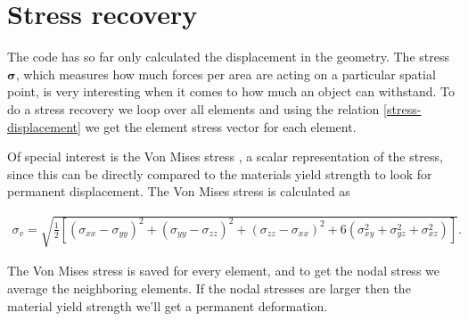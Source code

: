 \section{Stress recovery}

The code has so far only calculated the displacement in the geometry. The stress $\bm{\sigma}$, which measures how much forces per area are acting on a particular spatial point, is very interesting when it comes to how much an object can withstand. To do a stress recovery we loop over all elements and using the relation \eqref{stress-displacement} we get the element stress vector for each element.

Of special interest is the Von Mises stress \cite{VonMises}, a scalar representation of the stress, since this can be directly compared to the materials yield strength to look for permanent displacement. The Von Mises stress is calculated as 

\begin{align*}
\sigma_{v} = \sqrt{ \frac{1}{2} \left[  (\sigma_{xx} -\sigma_{yy})^2 + (\sigma_{yy} -\sigma_{zz})^2 + (\sigma_{zz} -\sigma_{xx})^2 + 6\left(\sigma_{xy}^2 + \sigma_{yz}^2 + \sigma_{xz}^2 \right) \right]}.
\end{align*}


The Von Mises stress is saved for every element, and to get the nodal stress we average the neighboring elements. If the nodal stresses are larger then the material yield strength we'll get a permanent deformation.